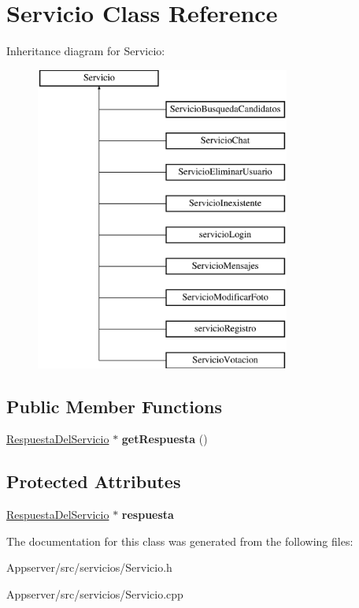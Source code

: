 \hypertarget{classServicio}{}\section{Servicio Class Reference}
\label{classServicio}
Inheritance diagram for Servicio\+:\begin{figure}[H]
\begin{center}
\leavevmode
\includegraphics[height=10.000000cm]{classServicio}
\end{center}
\end{figure}
\subsection*{Public Member Functions}
\begin{DoxyCompactItemize}
\item 
\hyperlink{classRespuestaDelServicio}{Respuesta\+Del\+Servicio} $\ast$ {\bfseries get\+Respuesta} ()\hypertarget{classServicio_a31441550855a7ba54b1a24f7187103d1}{}\label{classServicio_a31441550855a7ba54b1a24f7187103d1}

\end{DoxyCompactItemize}
\subsection*{Protected Attributes}
\begin{DoxyCompactItemize}
\item 
\hyperlink{classRespuestaDelServicio}{Respuesta\+Del\+Servicio} $\ast$ {\bfseries respuesta}\hypertarget{classServicio_a0bdb37ede65289e8508939786de91277}{}\label{classServicio_a0bdb37ede65289e8508939786de91277}

\end{DoxyCompactItemize}


The documentation for this class was generated from the following files\+:\begin{DoxyCompactItemize}
\item 
Appserver/src/servicios/Servicio.\+h\item 
Appserver/src/servicios/Servicio.\+cpp\end{DoxyCompactItemize}
